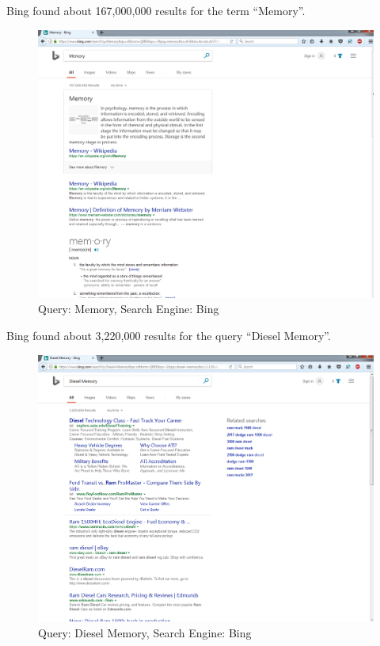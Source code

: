 \documentclass[a4paper, 11pt]{article}
\begin{document}
\pagebreak
Bing found about 167,000,000 results for the term ``Memory''.
\begin{figure}[h]
\caption{Query: Memory, Search Engine: Bing}
\centering
\includegraphics[scale=0.4]{Q1/MemoryBing.png}
\end{figure}

\pagebreak
Bing found about 3,220,000 results for the query ``Diesel Memory''.
\begin{figure}[h]
\caption{Query: Diesel Memory, Search Engine: Bing}
\centering
\includegraphics[scale=0.4]{Q1/DieselMemoryBing.png}
\end{figure}
\end{document}

